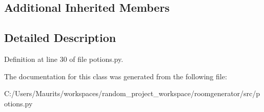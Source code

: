 \subsection*{Additional Inherited Members}


\subsection{Detailed Description}


Definition at line 30 of file potions.\+py.



The documentation for this class was generated from the following file\+:\begin{DoxyCompactItemize}
\item 
C\+:/\+Users/\+Maurits/workspaces/random\+\_\+project\+\_\+workspace/roomgenerator/src/potions.\+py\end{DoxyCompactItemize}
